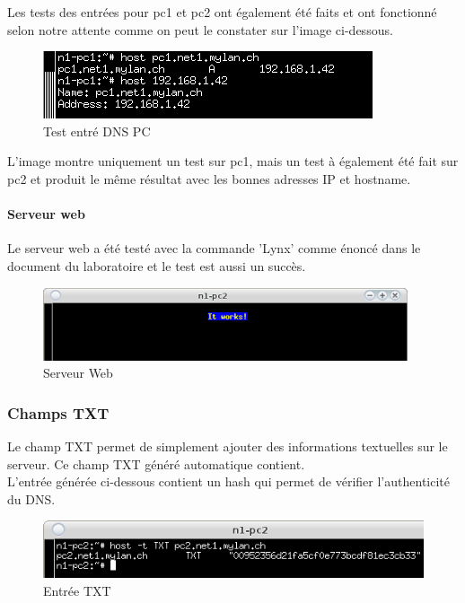 \documentclass{article}
\begin{document}
Les tests des entrées pour pc1 et pc2 ont également été faits et ont fonctionné selon notre attente comme on peut le constater sur l'image ci-dessous.

\begin{figure}[!h]
	\centering
	\includegraphics{./captures/2-test-dns-pc1.png}
	\caption{Test entré DNS PC}
	\label{fig:Test entrées DNS pc}
\end{figure}

L'image montre uniquement un test sur pc1, mais un test à également été fait sur pc2 et produit le même résultat avec les bonnes adresses IP et hostname.

\paragraph{Serveur web}

Le serveur web a été testé avec la commande 'Lynx' comme énoncé dans le document du laboratoire et le test est aussi un succès. \cite{doc-labo}

\begin{figure}[!h]
	\centering
	\includegraphics{./captures/ItWorks-www.png}
	\caption{Serveur Web}
	\label{fig:Serveur Web}
\end{figure}

\subsubsection{Champs TXT}

Le champ TXT permet de simplement ajouter des informations textuelles sur le serveur. Ce champ TXT généré automatique contient.\cite{TXT}\\

L'entrée générée ci-dessous contient un hash qui permet de vérifier l'authenticité du DNS.

\begin{figure}[!h]
	\centering
	\includegraphics{./captures/txt-entry.png}
	\caption{Entrée TXT}
	\label{fig:Entrée TXT}
\end{figure}
\end{document}
